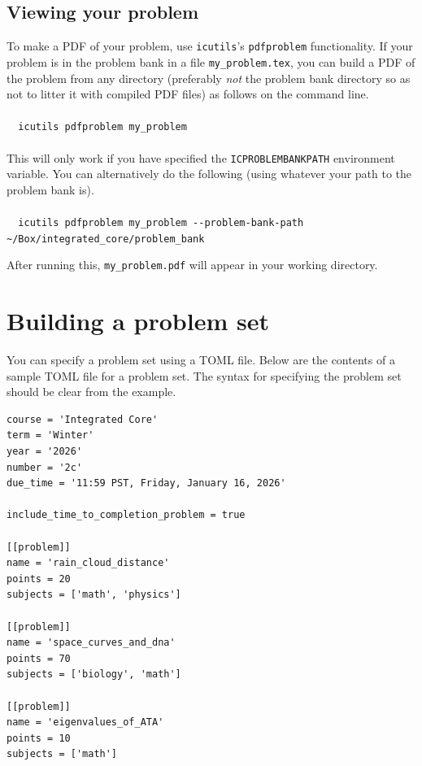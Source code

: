 
\subsection{Viewing your problem}
To make a PDF of your problem, use \texttt{icutils}'s \texttt{pdfproblem} functionality. If your problem is in the problem bank in a file \verb|my_problem.tex|, you can build a PDF of the problem from any directory (preferably \textit{not} the problem bank directory so as not to litter it with compiled PDF files) as follows on the command line.\\\\
\verb|  icutils pdfproblem my_problem|\\\\
This will only work if you have specified the \verb|ICPROBLEMBANKPATH| environment variable. You can alternatively do the following (using whatever your path to the problem bank is).\\\\
{\footnotesize \verb|  icutils pdfproblem my_problem --problem-bank-path ~/Box/integrated_core/problem_bank|}

After running this, \verb|my_problem.pdf| will appear in your working directory.

\pagebreak


\section{Building a problem set}
You can specify a problem set using a TOML file. Below are the contents of a sample TOML file for a problem set. The syntax for specifying the problem set should be clear from the example.

\begin{verbatim}
course = 'Integrated Core'
term = 'Winter'
year = '2026'
number = '2c'
due_time = '11:59 PST, Friday, January 16, 2026'

include_time_to_completion_problem = true

[[problem]]
name = 'rain_cloud_distance'
points = 20
subjects = ['math', 'physics']

[[problem]]
name = 'space_curves_and_dna'
points = 70
subjects = ['biology', 'math']

[[problem]]
name = 'eigenvalues_of_ATA'
points = 10
subjects = ['math']
\end{verbatim}

